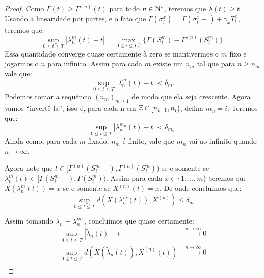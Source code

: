 \begin{proof}
  Como $\Gamma(t) \geq \Gamma^{(n)}(t)$ para todo $n \in {\mathbb{N^*}}$, teremos
  que $\lambda(t) \geq t$. Usando a linearidade por partes, e o fato
  que $\Gamma(\sigma^x_i) = \Gamma(\sigma_i^x-) + \gamma_x T^x_i$,
  teremos que:
  \begin{displaymath}
    \sup_{0 \leq t \leq T} |\lambda_n^m(t) - t| =
    \max_{0 \leq i \leq L_n^m} \{ \Gamma(S_i^m) -
    \Gamma^{(n)}(S_i^m)\}.
  \end{displaymath}
  Essa quantidade converge quase certamente à zero se mantivermos o
  $m$ fixo e jogarmos o $n$ para infinito. Assim para cada $m$ existe
  um $n_m$ tal que para $n \geq n_m$ vale que:
  \begin{displaymath}
    \sup_{0 \leq t \leq T} |\lambda_n^m(t) - t| < \delta_m.
  \end{displaymath}
  Podemos tomar a sequência $(n_m)_{m \geq 1}$ de modo que ela seja
  crescente. Agora vamos ``invertê-la'', isso é, para cada n em ${\mathbb{Z}}
  \cap [n_{i-1}, n_i)$, defina $m_n = i$. Teremos que:
  \begin{displaymath}
    \sup_{0 \leq t \leq T} |\lambda_n^{m_n}(t) - t| < \delta_{m_n}.
  \end{displaymath}
  Ainda como, para cada $m$ fixado, $n_m$ é finito, vale que $m_n$ vai
  ao infinito quando $n \to \infty$.
  
  Agora note que $t \in [\Gamma^{(n)}(S_{i}^m-),
  \Gamma^{(n)}(S_{i}^m))$ se e somente se $\lambda_n^m(t) \in
  [\Gamma(S_{i}^m-), \Gamma(S_{i}^m))$. Assim para cada $x \in \{1,
  \ldots, m\}$ teremos que $X(\lambda_n^m(t)) = x$ se e somente se
  $X^{(n)}(t) = x$. De onde concluímos que:
  \begin{displaymath}
    \sup_{0 \leq t \leq T} d\left(X(\lambda_n^m(t)), X^{(n)}\right)
    \leq \delta_m
  \end{displaymath}

  Assim tomando $\tilde{\lambda}_n = \lambda_n^{m_n}$, concluímos que
  quase certamente:
  \begin{align*}
    \sup_{0 \leq t \leq T} |\tilde{\lambda}_n(t) - t|
    &\xrightarrow{n\to\infty} 0 \\
    \sup_{0 \leq t \leq T} d(X(\tilde{\lambda}_n(t)), X^{(n)}(t))
    &\xrightarrow{n\to\infty} 0 \\
  \end{align*}
\end{proof}

